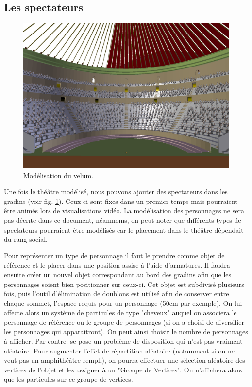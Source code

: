\subsection{Les spectateurs}

\begin{figure}[!h]
	\centering
	\includegraphics[width=\textwidth]{images/modPublic}
	\caption{Modélisation du \gls{velum}.} 
	\label{modPublic} 
\end{figure}

Une fois le théâtre modélisé, nous pouvons ajouter des spectateurs dans les gradins (voir fig. \ref{modPublic}). Ceux-ci sont fixes dans un premier temps mais pourraient être animés lors de visualisations vidéo. La modélisation des personnages ne sera pas décrite dans ce document, néanmoins, on peut noter que différents types de spectateurs pourraient être modélisés car le placement dans le théâtre dépendait du rang social.

Pour représenter un type de personnage il faut le prendre comme objet de référence et le placer dans une position assise à l'aide d'\glspl{armature}. Il faudra ensuite créer un nouvel objet correspondant au bord des gradins afin que les personnages soient bien positionner sur ceux-ci. Cet objet est subdivisé plusieurs fois, puis l'outil d'élimination de doublons est utilisé afin de conserver entre chaque sommet, l'espace requis pour un personnage (50cm par exemple). On lui affecte alors un système de \glspl{particule} de type "cheveux" auquel on associera le personnage de référence ou le groupe de personnages (si on a choisi de diversifier les personnages qui apparaitront). On peut ainsi choisir le nombre de personnages à afficher. Par contre, se pose un problème de disposition qui n'est pas vraiment aléatoire. Pour augmenter l'effet de répartition aléatoire (notamment si on ne veut pas un amphithéâtre rempli), on pourra effectuer une sélection aléatoire des vertices de l'objet et les assigner à un "Groupe de Vertices". On n'affichera alors que les particules sur ce groupe de vertices. 


